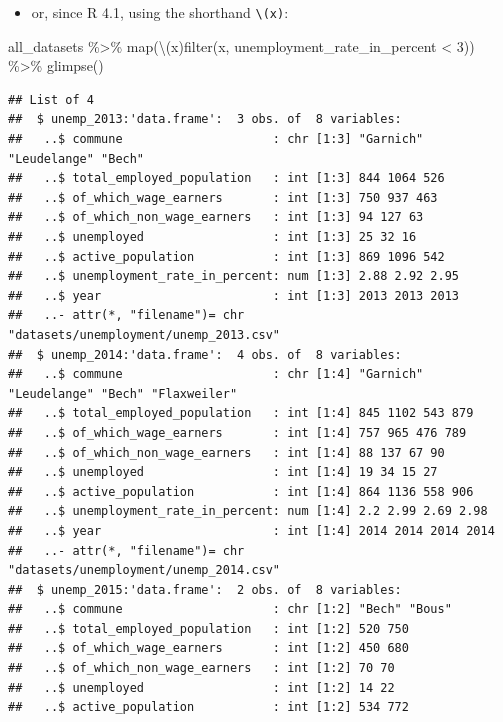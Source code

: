 \documentclass[
]{article}
\newenvironment{Shaded}{\begin{snugshade}}{\end{snugshade}}
\newcommand{\DecValTok}[1]{\textcolor[rgb]{0.00,0.00,0.81}{#1}}
\newcommand{\FunctionTok}[1]{\textcolor[rgb]{0.00,0.00,0.00}{#1}}
\newcommand{\NormalTok}[1]{#1}
\newcommand{\SpecialCharTok}[1]{\textcolor[rgb]{0.00,0.00,0.00}{#1}}
\providecommand{\tightlist}{%
  \setlength{\itemsep}{0pt}\setlength{\parskip}{0pt}}
\begin{document}
\begin{itemize}
\tightlist
\item
  or, since R 4.1, using the shorthand \texttt{\textbackslash{}(x)}:
\end{itemize}

\begin{Shaded}
\begin{Highlighting}[]
\NormalTok{all\_datasets }\SpecialCharTok{\%\textgreater{}\%}
  \FunctionTok{map}\NormalTok{(\textbackslash{}(x)}\FunctionTok{filter}\NormalTok{(x, unemployment\_rate\_in\_percent }\SpecialCharTok{\textless{}} \DecValTok{3}\NormalTok{)) }\SpecialCharTok{\%\textgreater{}\%}
  \FunctionTok{glimpse}\NormalTok{()}
\end{Highlighting}
\end{Shaded}

\begin{verbatim}
## List of 4
##  $ unemp_2013:'data.frame':  3 obs. of  8 variables:
##   ..$ commune                     : chr [1:3] "Garnich" "Leudelange" "Bech"
##   ..$ total_employed_population   : int [1:3] 844 1064 526
##   ..$ of_which_wage_earners       : int [1:3] 750 937 463
##   ..$ of_which_non_wage_earners   : int [1:3] 94 127 63
##   ..$ unemployed                  : int [1:3] 25 32 16
##   ..$ active_population           : int [1:3] 869 1096 542
##   ..$ unemployment_rate_in_percent: num [1:3] 2.88 2.92 2.95
##   ..$ year                        : int [1:3] 2013 2013 2013
##   ..- attr(*, "filename")= chr "datasets/unemployment/unemp_2013.csv"
##  $ unemp_2014:'data.frame':  4 obs. of  8 variables:
##   ..$ commune                     : chr [1:4] "Garnich" "Leudelange" "Bech" "Flaxweiler"
##   ..$ total_employed_population   : int [1:4] 845 1102 543 879
##   ..$ of_which_wage_earners       : int [1:4] 757 965 476 789
##   ..$ of_which_non_wage_earners   : int [1:4] 88 137 67 90
##   ..$ unemployed                  : int [1:4] 19 34 15 27
##   ..$ active_population           : int [1:4] 864 1136 558 906
##   ..$ unemployment_rate_in_percent: num [1:4] 2.2 2.99 2.69 2.98
##   ..$ year                        : int [1:4] 2014 2014 2014 2014
##   ..- attr(*, "filename")= chr "datasets/unemployment/unemp_2014.csv"
##  $ unemp_2015:'data.frame':  2 obs. of  8 variables:
##   ..$ commune                     : chr [1:2] "Bech" "Bous"
##   ..$ total_employed_population   : int [1:2] 520 750
##   ..$ of_which_wage_earners       : int [1:2] 450 680
##   ..$ of_which_non_wage_earners   : int [1:2] 70 70
##   ..$ unemployed                  : int [1:2] 14 22
##   ..$ active_population           : int [1:2] 534 772

\end{verbatim}
\end{document}
